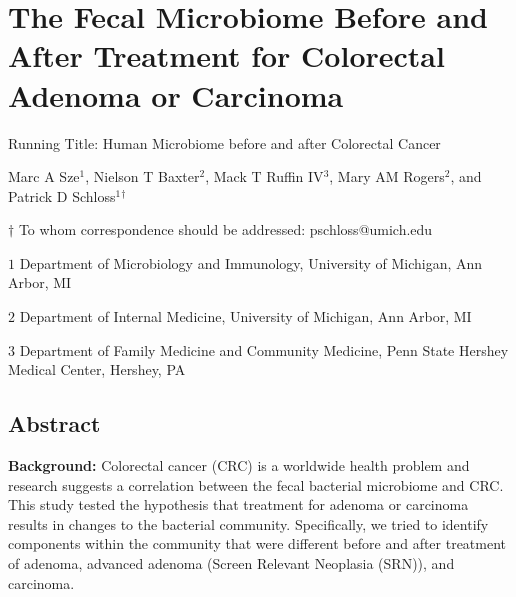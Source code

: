 \documentclass[12pt,]{article}
\title{}
\author{}
\date{}
\begin{document}
\section{The Fecal Microbiome Before and After Treatment for Colorectal
Adenoma or
Carcinoma}\label{the-fecal-microbiome-before-and-after-treatment-for-colorectal-adenoma-or-carcinoma}

\vspace{25mm}

\begin{center}
Running Title: Human Microbiome before and after Colorectal Cancer

\vspace{10mm}

Marc A Sze${^1}$, Nielson T Baxter${^2}$, Mack T Ruffin IV${^3}$, Mary AM Rogers${^2}$, and Patrick D Schloss${^1}$${^\dagger}$

\vspace{20mm}

$\dagger$ To whom correspondence should be addressed: pschloss@umich.edu

$1$ Department of Microbiology and Immunology, University of Michigan, Ann Arbor, MI

$2$ Department of Internal Medicine, University of Michigan, Ann Arbor, MI   

$3$ Department of Family Medicine and Community Medicine, Penn State Hershey Medical Center, Hershey, PA    


\end{center}

\newpage

\linenumbers

\subsection{Abstract}\label{abstract}

\textbf{Background:} Colorectal cancer (CRC) is a worldwide health
problem and research suggests a correlation between the fecal bacterial
microbiome and CRC. This study tested the hypothesis that treatment for
adenoma or carcinoma results in changes to the bacterial community.
Specifically, we tried to identify components within the community that
were different before and after treatment of adenoma, advanced adenoma
(Screen Relevant Neoplasia (SRN)), and carcinoma.
\end{document}
